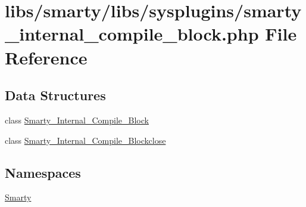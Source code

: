 \hypertarget{smarty__internal__compile__block_8php}{}\section{libs/smarty/libs/sysplugins/smarty\+\_\+internal\+\_\+compile\+\_\+block.php File Reference}
\label{smarty__internal__compile__block_8php}
\subsection*{Data Structures}
\begin{DoxyCompactItemize}
\item 
class \hyperlink{class_smarty___internal___compile___block}{Smarty\+\_\+\+Internal\+\_\+\+Compile\+\_\+\+Block}
\item 
class \hyperlink{class_smarty___internal___compile___blockclose}{Smarty\+\_\+\+Internal\+\_\+\+Compile\+\_\+\+Blockclose}
\end{DoxyCompactItemize}
\subsection*{Namespaces}
\begin{DoxyCompactItemize}
\item 
 \hyperlink{namespace_smarty}{Smarty}
\end{DoxyCompactItemize}
